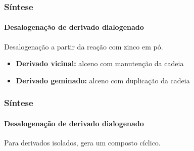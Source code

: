
\begin{frame}
\frametitle{Síntese}
\framesubtitle{Desalogenação de derivado dialogenado}

Desalogenação a partir da reação com zinco em pó.

\begin{itemize}

\item \textbf{Derivado vicinal:} alceno com manutenção da cadeia
\begin{figure}
\centering
{}
\end{figure}

\item \textbf{Derivado geminado:} alceno com duplicação da cadeia
\begin{figure}
\centering
{}
\end{figure}

\end{itemize}

\end{frame}

\begin{frame}
\frametitle{Síntese}
\framesubtitle{Desalogenação de derivado dialogenado}

Para derivados isolados, gera um composto cíclico.

\begin{figure}
\centering
{}
\end{figure}

\end{frame}
